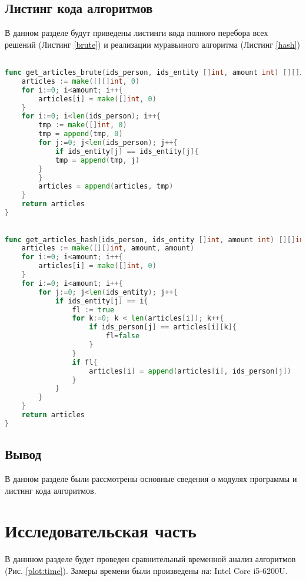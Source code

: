 \documentclass[12pt]{report}
\begin{document}
\section{Листинг кода алгоритмов}
В данном разделе будут приведены листинги кода полного перебора всех решений (Листинг \ref{brute}) и реализации муравьиного алгоритма (Листинг \ref{hash})
\begin{lstlisting}[label=brute,caption = Перебор всех возможных вариантов, language = go]

func get_articles_brute(ids_person, ids_entity []int, amount int) [][]int{
	articles := make([][]int, 0)
	for i:=0; i<amount; i++{
		articles[i] = make([]int, 0)
	}
	for i:=0; i<len(ids_person); i++{
		tmp := make([]int, 0)
		tmp = append(tmp, 0)
		for j:=0; j<len(ids_person); j++{
			if ids_entity[j] == ids_entity[j]{
			tmp = append(tmp, j)
		}		
		}
		articles = append(articles, tmp)
	}
	return articles
}
\end{lstlisting}

\begin{lstlisting}[label=hash,caption = Реализованный алгоритм, language = go]

func get_articles_hash(ids_person, ids_entity []int, amount int) [][]int{
	articles := make([][]int, amount, amount)
	for i:=0; i<amount; i++{
		articles[i] = make([]int, 0)
	}
	for i:=0; i<amount; i++{
		for j:=0; j<len(ids_entity); j++{
			if ids_entity[j] == i{
				fl := true
				for k:=0; k < len(articles[i]); k++{
					if ids_person[j] == articles[i][k]{
						fl=false
					}
				}
				if fl{
					articles[i] = append(articles[i], ids_person[j])
				}
			}		
		}
	}
	return articles
} 
\end{lstlisting}
\section*{Вывод}
В данном разделе были рассмотрены основные сведения о модулях программы и листинг кода алгоритмов.

\chapter{Исследовательская часть}
В даннном разделе будет проведен сравнительный временной анализ алгоритмов (Рис. \ref{plot:time}). Замеры времени были произведены на: Intel Core i5-6200U.
\end{document}
